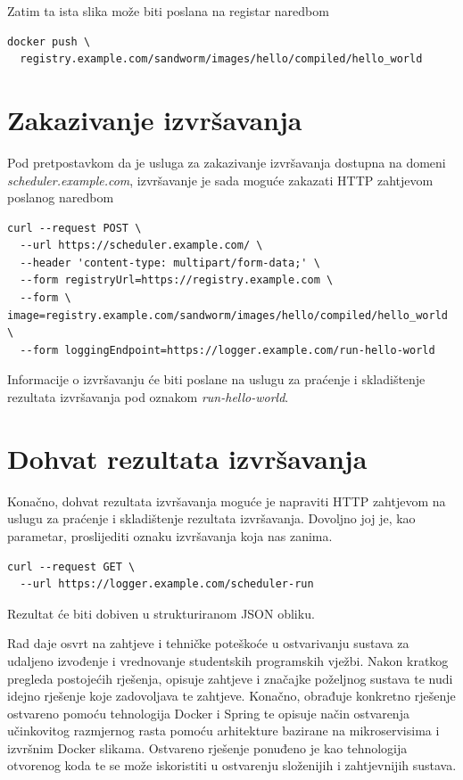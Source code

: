 \documentclass[times, utf8, zavrsni]{fer}
\begin{document}
{{{\begin{appendices}
Zatim ta ista slika može biti poslana na registar naredbom

\begin{lstlisting}
docker push \
  registry.example.com/sandworm/images/hello/compiled/hello_world
\end{lstlisting}

\section{Zakazivanje izvršavanja}

Pod pretpostavkom da je usluga za zakazivanje izvršavanja dostupna na domeni {\textit{scheduler.example.com}}, izvršavanje je sada moguće zakazati HTTP zahtjevom poslanog naredbom

\begin{lstlisting}
curl --request POST \
  --url https://scheduler.example.com/ \
  --header 'content-type: multipart/form-data;' \
  --form registryUrl=https://registry.example.com \
  --form \
image=registry.example.com/sandworm/images/hello/compiled/hello_world \
  --form loggingEndpoint=https://logger.example.com/run-hello-world
\end{lstlisting}

Informacije o izvršavanju će biti poslane na uslugu za praćenje i skladištenje rezultata izvršavanja pod oznakom {\textit{run-hello-world}}.

\section{Dohvat rezultata izvršavanja}

Konačno, dohvat rezultata izvršavanja moguće je napraviti HTTP zahtjevom na uslugu za praćenje i skladištenje rezultata izvršavanja. Dovoljno joj je, kao parametar, proslijediti oznaku izvršavanja koja nas zanima.

\begin{lstlisting}
curl --request GET \
  --url https://logger.example.com/scheduler-run
\end{lstlisting}

Rezultat će biti dobiven u strukturiranom JSON obliku.

\end{appendices}




\begin{sazetak}
Rad daje osvrt na zahtjeve i tehničke poteškoće u ostvarivanju sustava za udaljeno izvođenje i vrednovanje studentskih programskih vježbi. Nakon kratkog pregleda postojećih rješenja, opisuje zahtjeve i značajke poželjnog sustava te nudi idejno rješenje koje zadovoljava te zahtjeve. Konačno, obrađuje konkretno rješenje ostvareno pomoću tehnologija Docker i Spring te opisuje način ostvarenja učinkovitog razmjernog rasta pomoću arhitekture bazirane na mikroservisima i izvršnim Docker slikama. Ostvareno rješenje ponuđeno je kao tehnologija otvorenog koda te se može iskoristiti u ostvarenju složenijih i zahtjevnijih sustava.


\end{sazetak}}}}
\end{document}

